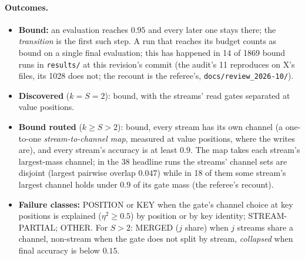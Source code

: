 \documentclass[11pt]{article}
\begin{document}
\paragraph{Outcomes.}
\begin{itemize}
\item \textbf{Bound:} an evaluation reaches $0.95$ and every later one stays there; the \emph{transition} is the first such step. A run that reaches its budget counts as bound on a single final evaluation; this has happened in 14 of 1869 bound runs in \texttt{results/} at this revision's commit (the audit's 11 reproduces on X's files, its 1028 does not; the recount is the referee's, \texttt{docs/review\_2026-10/}).
\item \textbf{Discovered} ($k = S = 2$): bound, with the streams' read gates separated at value positions.
\item \textbf{Bound routed} ($k \geq S > 2$): bound, every stream has its own channel (a one-to-one \emph{stream-to-channel map}, measured at value positions, where the writes are), and every stream's accuracy is at least $0.9$. The map takes each stream's largest-mass channel; in the 38 headline runs the streams' channel sets are disjoint (largest pairwise overlap $0.047$) while in 18 of them some stream's largest channel holds under $0.9$ of its gate mass (the referee's recount).
\item \textbf{Failure classes:} POSITION or KEY when the gate's channel choice at key positions is explained ($\eta^2 \geq 0.5$) by position or by key identity; STREAM-PARTIAL; OTHER. For $S > 2$: MERGED ($j$ share) when $j$ streams share a channel, non-stream when the gate does not split by stream, \emph{collapsed} when final accuracy is below $0.15$.
\end{itemize}
\end{document}
